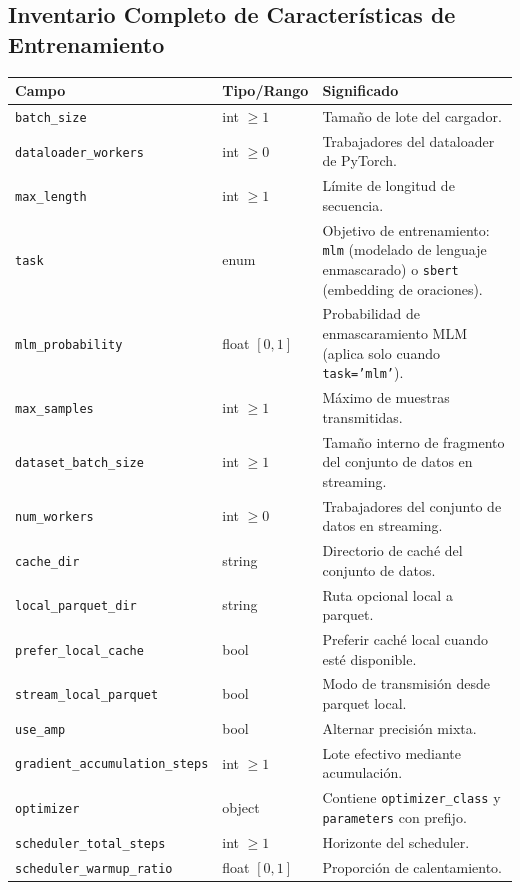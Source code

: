 \subsection{Inventario Completo de Características de Entrenamiento}

\small
\begin{longtable}{p{5.1cm}p{2.4cm}p{7.0cm}}
\toprule
\textbf{Campo} & \textbf{Tipo/Rango} & \textbf{Significado} \\
\midrule
\endhead
\texttt{batch\_size} & int $\ge 1$ & Tamaño de lote del cargador. \\
\texttt{dataloader\_workers} & int $\ge 0$ & Trabajadores del dataloader de PyTorch. \\
\texttt{max\_length} & int $\ge 1$ & Límite de longitud de secuencia. \\
\texttt{task} & enum & Objetivo de entrenamiento: \texttt{mlm} (modelado de lenguaje enmascarado) o \texttt{sbert} (embedding de oraciones). \\
\texttt{mlm\_probability} & float $[0,1]$ & Probabilidad de enmascaramiento MLM (aplica solo cuando \texttt{task='mlm'}). \\
\texttt{max\_samples} & int $\ge 1$ & Máximo de muestras transmitidas. \\
\texttt{dataset\_batch\_size} & int $\ge 1$ & Tamaño interno de fragmento del conjunto de datos en streaming. \\
\texttt{num\_workers} & int $\ge 0$ & Trabajadores del conjunto de datos en streaming. \\
\texttt{cache\_dir} & string & Directorio de caché del conjunto de datos. \\
\texttt{local\_parquet\_dir} & string & Ruta opcional local a parquet. \\
\texttt{prefer\_local\_cache} & bool & Preferir caché local cuando esté disponible. \\
\texttt{stream\_local\_parquet} & bool & Modo de transmisión desde parquet local. \\
\texttt{use\_amp} & bool & Alternar precisión mixta. \\
\texttt{gradient\_accumulation\_steps} & int $\ge 1$ & Lote efectivo mediante acumulación. \\
\texttt{optimizer} & object & Contiene \texttt{optimizer\_class} y \texttt{parameters} con prefijo. \\
\texttt{scheduler\_total\_steps} & int $\ge 1$ & Horizonte del scheduler. \\
\texttt{scheduler\_warmup\_ratio} & float $[0,1]$ & Proporción de calentamiento. \\

\end{longtable}
